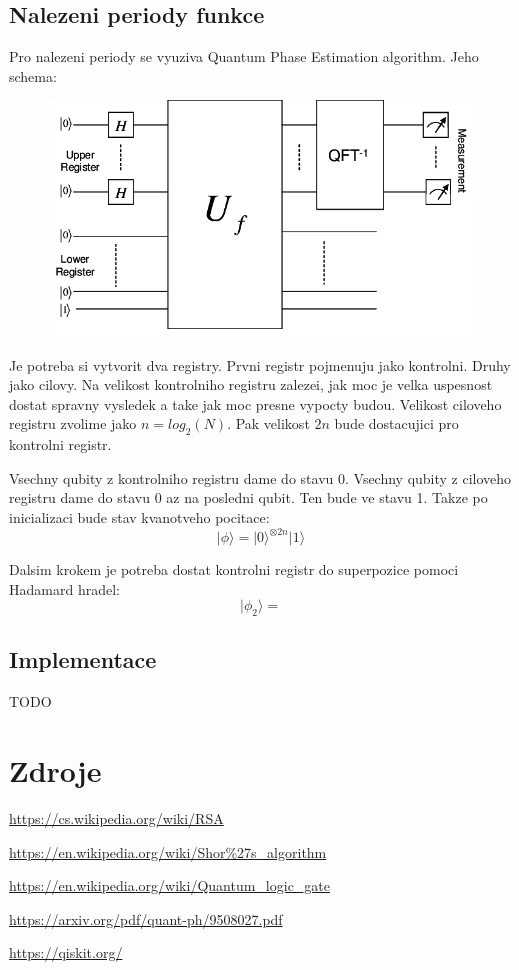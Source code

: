 \documentclass[11pt]{article}
\begin{document}
\subsection{Nalezeni periody funkce}
Pro nalezeni periody se vyuziva Quantum Phase Estimation algorithm. Jeho schema:
\begin{figure}[htbp]
    \includegraphics[scale=.5]{High-level-diagram-of-Shors-algorithm-Upper-register-consists-of-2n-qubits-and-holds}
    \centering
\end{figure}
\par Je potreba si vytvorit dva registry. Prvni registr pojmenuju jako kontrolni. Druhy jako cilovy.
Na velikost kontrolniho registru zalezei, jak moc je velka uspesnost dostat spravny vysledek a take jak moc presne vypocty budou.
Velikost ciloveho registru zvolime jako $n = log_2(N)$.
Pak velikost $2n$ bude dostacujici pro kontrolni registr.
\par Vsechny qubity z kontrolniho registru dame do stavu $0$. Vsechny qubity z ciloveho registru dame do stavu $0$ az na posledni qubit. Ten bude ve stavu 1.
Takze po inicializaci bude stav kvanotveho pocitace:
$$|\phi\rangle = |0\rangle^{\otimes 2n} |1\rangle$$ 
\par Dalsim krokem je potreba dostat kontrolni registr do superpozice pomoci Hadamard hradel:
$$|\phi_2\rangle = $$

\subsection{Implementace}
TODO

\newpage


\section{Zdroje}
\color{blue}
\fontsize{10pt}{0}
\url{https://cs.wikipedia.org/wiki/RSA}
\par\url{https://en.wikipedia.org/wiki/Shor%27s_algorithm}
\par\url{https://en.wikipedia.org/wiki/Quantum_logic_gate}
\par\url{https://arxiv.org/pdf/quant-ph/9508027.pdf}
\par\url{https://qiskit.org/}
\end{document}
